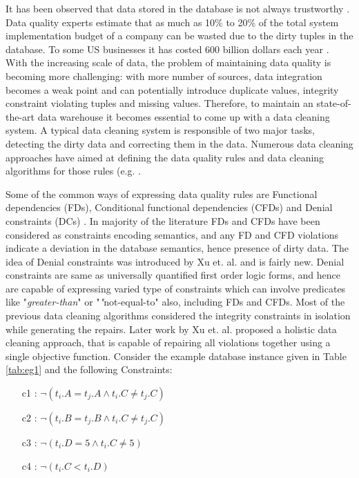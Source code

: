 It has been observed that data stored in the database is not always trustworthy \cite{Redman}.
Data quality experts estimate that as much as 10\% to 20\% of the total system implementation budget of a company can be wasted due to the dirty tuples in the database.
To some US businesses it has costed 600 billion dollars each year \cite{TDWI02}.
With the increasing scale of data, the problem of maintaining data quality is becoming more challenging: 
with more number of sources, data integration becomes a weak point and can potentially introduce duplicate values, integrity constraint violating tuples and missing values.
Therefore, to maintain an state-of-the-art data warehouse it becomes essential to come up with a data cleaning system.
A typical data cleaning system is responsible of two major tasks, detecting the dirty data and correcting them in the data.
Numerous data cleaning approaches have aimed at defining the data quality rules and data cleaning algorithms for those rules (e.g. \cite{Cong,Fan,Kolahi,XuChu}.

Some of the common ways of expressing data quality rules are Functional dependencies (FDs), Conditional functional dependencies (CFDs) and Denial constraints (DCs) \cite{XuChu}.
In majority of the literature FDs and CFDs have been considered as constraints encoding semantics, and any FD and CFD violations indicate a deviation in the database semantics, hence presence of dirty data.
The idea of Denial constraints was introduced by Xu et. al. \cite{XuChuDC} and is fairly new.
Denial constraints are same as universally quantified first order logic forms, and hence are capable of expressing varied type of constraints which can involve predicates
like "\textit{greater-than}" or "\textit"{not-equal-to}" also, including FDs and CFDs.
Most of the previous data cleaning algorithms \cite{Cong,Fan,Kolahi} considered the integrity constraints in isolation while generating the repairs.
Later work by Xu et. al.\cite{XuChu} proposed a holistic data cleaning approach, that is capable of repairing all violations together using a single objective function.
Consider the example database instance given in Table \ref{tab:eg1} and the following Constraints:

\begin{enumerate}
\item[c1] : $ \neg(t_i.A = t_j.A \wedge t_i.C \neq t_j.C)$
\item[c2] : $ \neg(t_i.B = t_j.B \wedge t_i.C \neq t_j.C)$
\item[c3] : $ \neg(t_i.D = 5 \wedge t_i.C \neq 5)$
\item[c4] : $ \neg(t_i.C < t_i.D )$
\end{enumerate}

